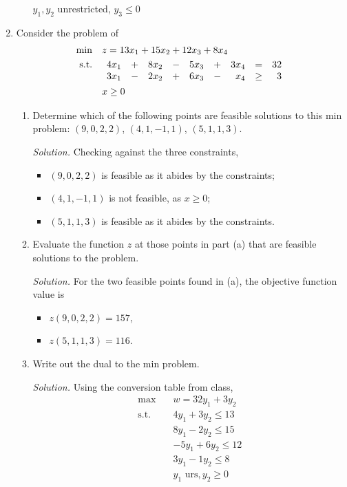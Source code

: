 \documentclass{homework}
\newcommand{\st}{\mathrm{s.t.}}
\newcommand{\solution}{	\vspace{1em} \textit{Solution.} \quad }
\newcommand{\bolditem}[1][YYY]{\item[\textbf{#1}]}
\begin{document}
\begin{enumerate}
\begin{enumerate}
				$y_1, y_2$ unrestricted, $y_3 \le 0$
		\end{enumerate}

	\pagebreak
	
		\bolditem[4.4.6] Consider the problem of \begin{align*}
			\min \quad & z = 13 x_1 + 15 x_2 + 12 x_3 + 8 x_4 \\
			\st \quad & \begin{array}[t]{rrrrrrrrr}
				4 x_1 & + & 8 x_2 & - & 5 x_3 & + & 3 x_4 & = & 32 \\
				3 x_1 & - & 2 x_2 & + & 6 x_3 & - & x_4 & \ge & 3 \\
			\end{array} \\
			& x \ge 0
		\end{align*}
		\begin{enumerate}
			\item Determine which of the following points are feasible solutions to this min problem: $(9, 0, 2, 2)$, $(4, 1, -1, 1)$, $(5, 1, 1, 3)$.
			
			\solution Checking against the three constraints, \begin{itemize}
				\item $(9, 0, 2, 2)$ is feasible as it abides by the constraints;
				\item $(4, 1, -1, 1)$ is not feasible, as $x \ge 0$;
				\item $(5, 1, 1, 3)$ is feasible as it abides by the constraints.
			\end{itemize}
		
			\item Evaluate the function $z$ at those points in part (a) that are feasible solutions to the problem.
			
			\solution For the two feasible points found in (a), the objective function value is\begin{itemize}
				\item $z(9, 0, 2, 2) = 157$,
				\item $z(5, 1, 1, 3) = 116$.
			\end{itemize}
			
			\item Write out the dual to the min problem.
			
			\solution Using the conversion table from class, \begin{align*}
				\max \quad & w = 32 y_1 + 3 y_2 \\
					\st \quad & 4 y_1 + 3 y_2 \le 13 \\
						& 8 y_1 - 2 y_2 \le 15 \\
						& -5y_1 + 6 y_2 \le 12 \\
						& 3 y_1 - 1 y_2 \le 8 \\
						& y_1 \text{ urs}, y_2 \ge 0
			\end{align*}
			

\end{enumerate}
\end{enumerate}
\end{document}
